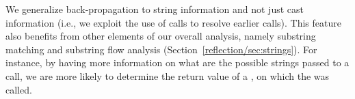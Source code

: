 \begin{compactitem}
  


\item We generalize back-propagation to string information and not
  just cast information (i.e., we exploit the use of
   calls to resolve earlier
   calls). This feature also benefits from other
  elements of our overall analysis, namely substring matching and
  substring flow analysis (Section~\ref{reflection/sec:strings}). For instance,
  by having more information on what are the possible strings passed
  to a  call, we are more likely to determine the
  return value of a , on which the  was
  called.
\end{compactitem}




